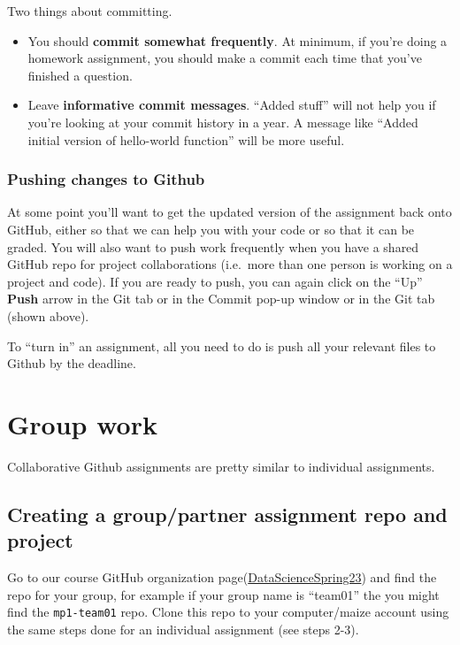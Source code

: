 \documentclass[
]{book}
\providecommand{\tightlist}{%
  \setlength{\itemsep}{0pt}\setlength{\parskip}{0pt}}
\begin{document}
Two things about committing.

\begin{itemize}
\tightlist
\item
  You should \textbf{commit somewhat frequently}. At minimum, if you're
  doing a homework assignment, you should make a commit each time that
  you've finished a question.
\item
  Leave \textbf{informative commit messages}. ``Added stuff'' will not help
  you if you're looking at your commit history in a year. A message
  like ``Added initial version of hello-world function'' will be more
  useful.
\end{itemize}

\hypertarget{pushing-changes-to-github}{%
\subsubsection{Pushing changes to Github}\label{pushing-changes-to-github}}

At some point you'll want to get the updated version of the assignment
back onto GitHub, either so that we can help you with your code or so
that it can be graded. You will also want to push work frequently when
you have a shared GitHub repo for project collaborations (i.e.~more than
one person is working on a project and code). If you are ready to push,
you can again click on the ``Up'' \textbf{Push} arrow in the Git tab or in the
Commit pop-up window or in the Git tab (shown above).

To ``turn in'' an assignment, all you need to do is push all your relevant
files to Github by the deadline.

\hypertarget{group-work}{%
\section{Group work}\label{group-work}}

Collaborative Github assignments are pretty similar to individual assignments.

\hypertarget{creating-a-grouppartner-assignment-repo-and-project}{%
\subsection{Creating a group/partner assignment repo and project}\label{creating-a-grouppartner-assignment-repo-and-project}}

Go to our course GitHub organization page(\href{https://github.com/DataScienceSpring23}{DataScienceSpring23}) and find the repo for your group, for example if your group name is ``team01'' the you might find the \texttt{mp1-team01} repo. Clone this repo to your computer/maize account using the same steps done for an individual assignment (see steps 2-3).
\end{document}
